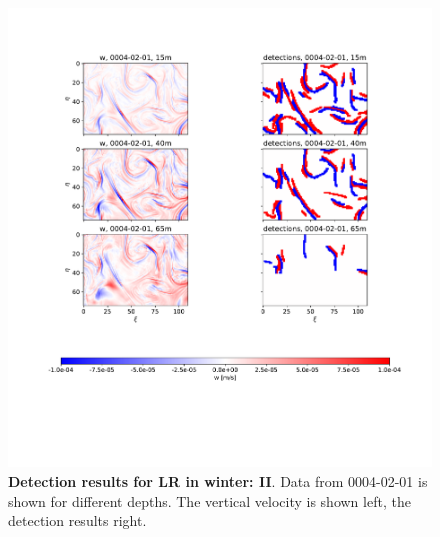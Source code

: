 \begin{figure}
    \centering
    \includegraphics[width=16cm, trim=2.5cm 0 0 2cm]{figures/eval_det_meso_winter2.pdf}
    \caption[Detection results for LR in winter: II]{\textbf{Detection results for LR in winter: II}. Data from 0004-02-01 is shown for different depths. The vertical velocity is shown left, the detection results right.}\label{fig:subm_det_winter_meso2}
\end{figure}

